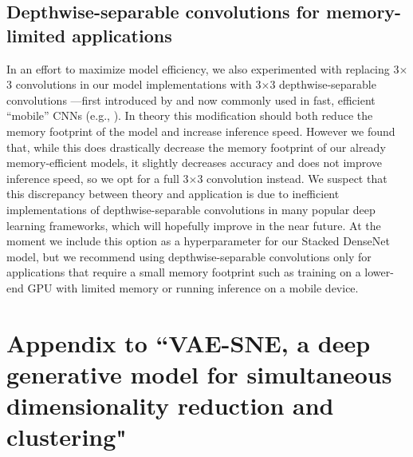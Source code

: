 \documentclass[11pt,a4paper,twoside]{book}
\begin{document}
\begin{doublespace}
\begin{appendices}
\section[Depthwise-separable convolutions]{Depthwise-separable convolutions for memory-limited applications}
In an effort to maximize model efficiency, we also experimented with replacing 3$\times$3 convolutions in our model implementations with 3$\times$3 depthwise-separable convolutions —first introduced by \cite{chollet2017xception} and now commonly used in fast, efficient “mobile” CNNs (e.g., \citealt{sandler2018mobilenetv2}). In theory this modification should both reduce the memory footprint of the model and increase inference speed. However we found that, while this does drastically decrease the memory footprint of our already memory-efficient models, it slightly decreases accuracy and does not improve inference speed, so we opt for a full 3$\times$3 convolution instead. We suspect that this discrepancy between theory and application is due to inefficient implementations of depthwise-separable convolutions in many popular deep learning frameworks, which will hopefully improve in the near future. At the moment we include this option as a hyperparameter for our Stacked DenseNet model, but we recommend using depthwise-separable convolutions only for applications that require a small memory footprint such as training on a lower-end GPU with limited memory or running inference on a mobile device.

\chapter[VAE-SNE]{Appendix to ``VAE-SNE, a deep generative model for simultaneous dimensionality reduction and clustering"}


\end{appendices}
\end{doublespace}
\end{document}
